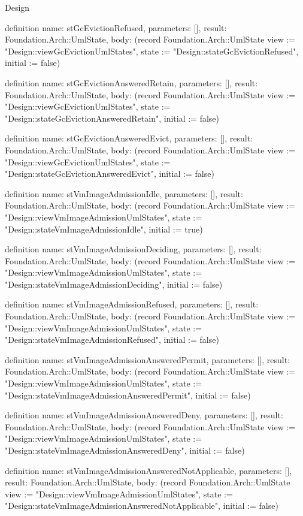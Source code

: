 \begin{lexlean}{Design}
\begin{semanticmodule}
definition{
  name: stGcEvictionRefused,
  parameters: [],
  result: Foundation.Arch::UmlState,
  body: (record Foundation.Arch::UmlState {view := "Design::viewGcEvictionUmlStates", state := "Design::stateGcEvictionRefused", initial := false})
}

definition{
  name: stGcEvictionAnsweredRetain,
  parameters: [],
  result: Foundation.Arch::UmlState,
  body: (record Foundation.Arch::UmlState {view := "Design::viewGcEvictionUmlStates", state := "Design::stateGcEvictionAnsweredRetain", initial := false})
}

definition{
  name: stGcEvictionAnsweredEvict,
  parameters: [],
  result: Foundation.Arch::UmlState,
  body: (record Foundation.Arch::UmlState {view := "Design::viewGcEvictionUmlStates", state := "Design::stateGcEvictionAnsweredEvict", initial := false})
}

definition{
  name: stVmImageAdmissionIdle,
  parameters: [],
  result: Foundation.Arch::UmlState,
  body: (record Foundation.Arch::UmlState {view := "Design::viewVmImageAdmissionUmlStates", state := "Design::stateVmImageAdmissionIdle", initial := true})
}

definition{
  name: stVmImageAdmissionDeciding,
  parameters: [],
  result: Foundation.Arch::UmlState,
  body: (record Foundation.Arch::UmlState {view := "Design::viewVmImageAdmissionUmlStates", state := "Design::stateVmImageAdmissionDeciding", initial := false})
}

definition{
  name: stVmImageAdmissionRefused,
  parameters: [],
  result: Foundation.Arch::UmlState,
  body: (record Foundation.Arch::UmlState {view := "Design::viewVmImageAdmissionUmlStates", state := "Design::stateVmImageAdmissionRefused", initial := false})
}

definition{
  name: stVmImageAdmissionAnsweredPermit,
  parameters: [],
  result: Foundation.Arch::UmlState,
  body: (record Foundation.Arch::UmlState {view := "Design::viewVmImageAdmissionUmlStates", state := "Design::stateVmImageAdmissionAnsweredPermit", initial := false})
}

definition{
  name: stVmImageAdmissionAnsweredDeny,
  parameters: [],
  result: Foundation.Arch::UmlState,
  body: (record Foundation.Arch::UmlState {view := "Design::viewVmImageAdmissionUmlStates", state := "Design::stateVmImageAdmissionAnsweredDeny", initial := false})
}

definition{
  name: stVmImageAdmissionAnsweredNotApplicable,
  parameters: [],
  result: Foundation.Arch::UmlState,
  body: (record Foundation.Arch::UmlState {view := "Design::viewVmImageAdmissionUmlStates", state := "Design::stateVmImageAdmissionAnsweredNotApplicable", initial := false})
}


\end{semanticmodule}
\end{lexlean}
